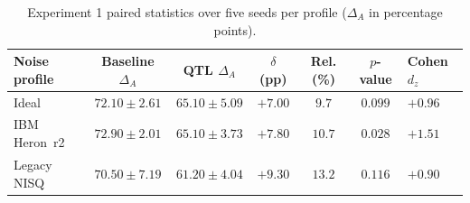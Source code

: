 \begin{table}[ht]
\centering
\caption{Experiment 1 paired statistics over five seeds per profile ($\Delta_A$ in percentage points).}
\label{tab:exp1_stats}
\begin{tabular}{lccccc}
\toprule
\textbf{Noise profile} & \textbf{Baseline $\Delta_A$} & \textbf{QTL $\Delta_A$} & \textbf{$\delta$ (pp)} & \textbf{Rel. (\%)} & \textbf{$p$-value} & \textbf{Cohen $d_z$} \\
\midrule
Ideal & $72.10 \pm 2.61$ & $65.10 \pm 5.09$ & $+7.00$ & $9.7$ & $0.099$ & $+0.96$ \\
IBM Heron~r2 & $72.90 \pm 2.01$ & $65.10 \pm 3.73$ & $+7.80$ & $10.7$ & $0.028$ & $+1.51$ \\
Legacy NISQ & $70.50 \pm 7.19$ & $61.20 \pm 4.04$ & $+9.30$ & $13.2$ & $0.116$ & $+0.90$ \\
\bottomrule
\end{tabular}
\end{table}
